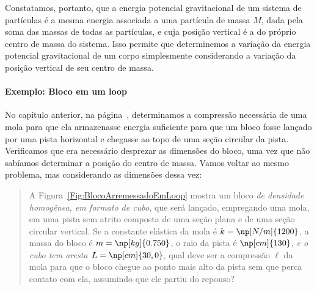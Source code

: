 Constatamos, portanto, que a energia potencial gravitacional de um sistema de partículas é a mesma energia associada a uma partícula de massa $M$, dada pela soma das massas de todas as partículas, e cuja posição vertical é a do próprio centro de massa do sistema. Isso permite que determinemos a variação da energia potencial gravitacional de um corpo simplesmente considerando a variação da posição vertical de seu centro de massa.

\paragraph{Exemplo: Bloco em um loop}

No capítulo anterior, na página~\pageref{Pag:ExercicioBlocoPistaCircularVertical}, determinamos a compressão necessária de uma mola para que ela armazenasse energia suficiente para que um bloco fosse lançado por uma pista horizontal e chegasse ao topo de uma seção circular da pista. Verificamos que era necessário desprezar as dimensões do bloco, uma vez que não sabíamos determinar a posição do centro de massa. Vamos voltar ao mesmo problema, mas considerando as dimensões dessa vez:
\begin{quote}
    A Figura~\ref{Fig:BlocoArremessadoEmLoop} mostra um bloco \emph{de densidade homogênea, em formato de cubo,} que será lançado, empregando uma mola, em uma pista sem atrito composta de uma seção plana e de uma seção circular vertical. Se a constante elástica da mola é $k = \np[N/m]{1200}$, a massa do bloco é $m = \np[kg]{0.750}$, o raio da pista é $\np[cm]{130}$, \emph{e o cubo tem aresta $L = \np[cm]{30,0}$}, qual deve ser a compressão $\ell$ da mola para que o bloco chegue ao ponto mais alto da pista sem que perca contato com ela, assumindo que ele partiu do repouso?
\end{quote}


